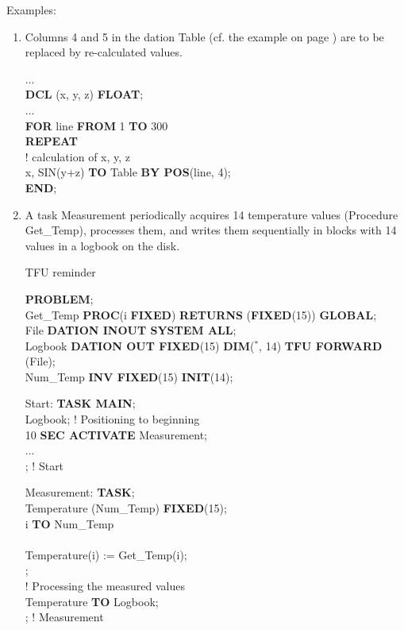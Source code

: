 Examples:

\begin{enumerate}
\item Columns 4 and 5 in the dation Table (cf. the example on page
\pageref{Example}) are to be replaced by re-calculated values.

...\\
{\bf DCL} (x, y, z) {\bf FLOAT};\\
...\\
{\bf FOR} line {\bf FROM} 1 {\bf TO} 300\\
{\bf REPEAT}\\
\x ! calculation of x, y, z\\
 x, SIN(y+z) {\bf TO} Table {\bf BY POS}(line, 4);\\
{\bf END};

\item A task Measurement periodically acquires 14 temperature values
(Procedure Get\_Temp), processes them, and writes them sequentially in
blocks with 14 values in a logbook on the disk.

\begin{discuss}
TFU reminder

\end{discuss}

{\bf PROBLEM};\\
 Get\_Temp {\bf PROC}(i {\bf FIXED}) {\bf RETURNS} ({\bf FIXED}(15)) {\bf GLOBAL};\\
 File {\bf DATION INOUT SYSTEM ALL};\\
 Logbook {\bf DATION OUT FIXED}(15) {\bf DIM}($^*$, 14) {\bf TFU FORWARD}\\
\x {} (File);\\
 Num\_Temp {\bf INV FIXED}(15) {\bf INIT}(14);

Start: {\bf TASK MAIN};\\
 Logbook; \x ! Positioning to beginning\\
 10 {\bf SEC ACTIVATE} Measurement;\\
\x ... \\
; ! Start

Measurement: {\bf TASK};\\
 Temperature (Num\_Temp) {\bf FIXED}(15); \\
 i {\bf TO} Num\_Temp\\
\\
\x \x Temperature(i) := Get\_Temp(i);\\
;\\
\x ! Processing the measured values\\
 Temperature {\bf TO} Logbook; \\
; ! Measurement
\end{enumerate}

